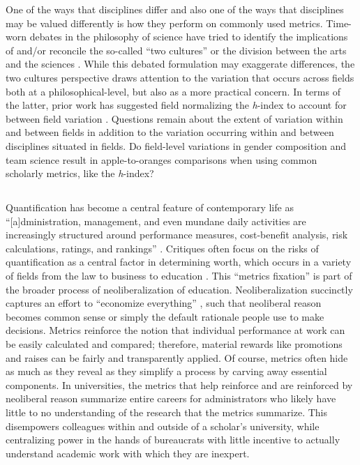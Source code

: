 \documentclass[
  10pt,
  letterpaper,
]{article}
\providecommand{\DIFaddtex}[1]{{\protect\color{blue}\uwave{#1}}} %
\providecommand{\DIFaddbegin}{} %
\providecommand{\DIFaddend}{} %
\providecommand{\DIFdelbegin}{} %
\providecommand{\DIFdelend}{} %
\providecommand{\DIFadd}[1]{\texorpdfstring{\DIFaddtex{#1}}{#1}} %
\newcommand{\DIFscaledelfig}{0.5}
\newlength{\DIFdelgraphicswidth} %
\newlength{\DIFdelgraphicsheight} %
\newcommand{\DIFaddincludegraphics}[2][]{{\color{blue}\fbox{\DIFOincludegraphics[#1]{#2}}}} %
\newcommand{\DIFdelincludegraphics}[2][]{%
\sbox{\DIFdelgraphicsbox}{\DIFOincludegraphics[#1]{#2}}%
\settoboxwidth{\DIFdelgraphicswidth}{\DIFdelgraphicsbox} %
\settoboxtotalheight{\DIFdelgraphicsheight}{\DIFdelgraphicsbox} %
\scalebox{\DIFscaledelfig}{%
\parbox[b]{\DIFdelgraphicswidth}{\usebox{\DIFdelgraphicsbox}\\[-\baselineskip] \rule{\DIFdelgraphicswidth}{0em}}\llap{\resizebox{\DIFdelgraphicswidth}{\DIFdelgraphicsheight}{%
\setlength{\unitlength}{\DIFdelgraphicswidth}%
\begin{picture}(1,1)%
\thicklines\linethickness{2pt} %
{\color[rgb]{1,0,0}\put(0,0){\framebox(1,1){}}}%
{\color[rgb]{1,0,0}\put(0,0){\line( 1,1){1}}}%
{\color[rgb]{1,0,0}\put(0,1){\line(1,-1){1}}}%
\end{picture}%
}\hspace*{3pt}}} %
} %
\DeclareRobustCommand{\DIFaddbegin}{\DIFOaddbegin \let\includegraphics\DIFaddincludegraphics} %
\DeclareRobustCommand{\DIFaddend}{\DIFOaddend \let\includegraphics\DIFOincludegraphics} %
\DeclareRobustCommand{\DIFdelbegin}{\DIFOdelbegin \let\includegraphics\DIFdelincludegraphics} %
\DeclareRobustCommand{\DIFdelend}{\DIFOaddend \let\includegraphics\DIFOincludegraphics} %
\begin{document}
One of the ways that disciplines differ and also one of the ways that
disciplines may be valued differently is how they perform on commonly
used metrics. Time-worn debates in the philosophy of science have tried
to identify the implications of and/or reconcile the so-called ``two
cultures'' or the division between the arts and the sciences
\citep{snow_two_2012}. While this debated formulation may exaggerate
differences, the two cultures perspective draws attention to the
variation that occurs across fields both at a philosophical-level, but
also as a more practical concern. In terms of the latter, prior work has
suggested field normalizing the \emph{h}-index to account for between
field variation \citep{bi_four_2023}. Questions remain about the extent
of variation within and between fields in addition to the variation
occurring within and between disciplines situated in fields. Do
field-level variations in gender composition and team science result in
apple-to-oranges comparisons when using common scholarly metrics, like
the \emph{h}-index?

\DIFdelbegin %
\DIFdelend \DIFaddbegin \subsection{\DIFadd{The Risks of
Quantification}}\label{the-risks-of-quantification}
\DIFaddend 

Quantification has become a central feature of contemporary life as
``{[}a{]}dministration, management, and even mundane daily activities
are increasingly structured around performance measures, cost-benefit
analysis, risk calculations, ratings, and rankings''
\citep[p.~224]{mennicken_what_2019}. Critiques often focus on the risks
of quantification as a central factor in determining worth, which occurs
in a variety of fields from the law to business to education
\citep[p.~4]{muller_tyranny_2019}. This ``metrics fixation'' is part of
the broader process of neoliberalization of education. Neoliberalization
succinctly captures an effort to ``economize everything''
\citep[p.~171]{berg_producing_2016}, such that neoliberal reason becomes
common sense or simply the default rationale people use to make
decisions. Metrics reinforce the notion that individual performance at
work can be easily calculated and compared; therefore, material rewards
like promotions and raises can be fairly and transparently applied. Of
course, metrics often hide as much as they reveal as they simplify a
process by carving away essential components. In universities, the
metrics that help reinforce and are reinforced by neoliberal reason
summarize entire careers for administrators who likely have little to no
understanding of the research that the metrics summarize. This
disempowers colleagues within and outside of a scholar's university,
while centralizing power in the hands of bureaucrats with little
incentive to actually understand academic work with which they are
inexpert.
\end{document}
